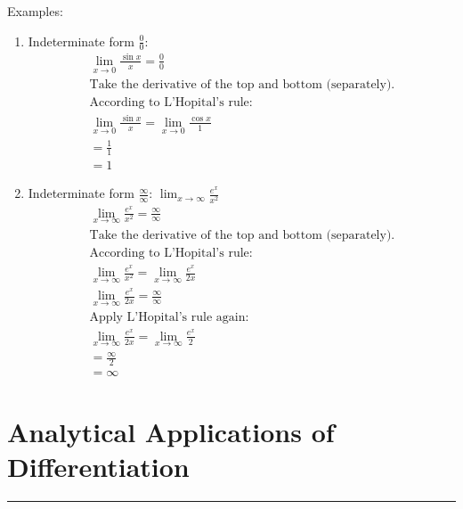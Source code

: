 \documentclass[12pt]{article}
\newcommand{\fline}{\par\noindent\rule{\textwidth}{0.1pt}} %
\begin{document}
            \noindent Examples:
            \begin{enumerate}
                \item Indeterminate form $\frac{0}{0}$:
                \begin{gather*}
                    \lim_{x \to 0} \frac{\sin{x}}{x} = \frac{0}{0} \\[6pt]
                    \text{Take the derivative of the top and bottom (separately).}\\
                    \text{According to L'Hopital's rule:} \\
                    \lim_{x \to 0} \frac{\sin{x}}{x} = \lim_{x \to 0} \frac{\cos{x}}{1} \\[6pt]
                    = \frac{1}{1} \\[6pt]
                    = 1
                \end{gather*}

                \item Indeterminate form $\frac{\infty}{\infty}$: $\lim_{x \to \infty} \frac{e^x}{x^2}$
                \begin{gather*}
                    \lim_{x \to \infty} \frac{e^x}{x^2} = \frac{\infty}{\infty} \\[6pt]
                    \text{Take the derivative of the top and bottom (separately).}\\
                    \text{According to L'Hopital's rule:} \\
                    \lim_{x \to \infty} \frac{e^x}{x^2} = \lim_{x \to \infty} \frac{e^x}{2x} \\[6pt]
                    \lim_{x \to \infty} \frac{e^x}{2x} = \frac{\infty}{\infty} \\[6pt]
                    \text{Apply L'Hopital's rule again:} \\
                    \lim_{x \to \infty} \frac{e^x}{2x} = \lim_{x \to \infty} \frac{e^x}{2} \\[6pt]
                    = \frac{\infty}{2} \\[6pt]
                    = \infty
                \end{gather*}
            \end{enumerate}

    \section{Analytical Applications of Differentiation}
    \fline
\end{document}

